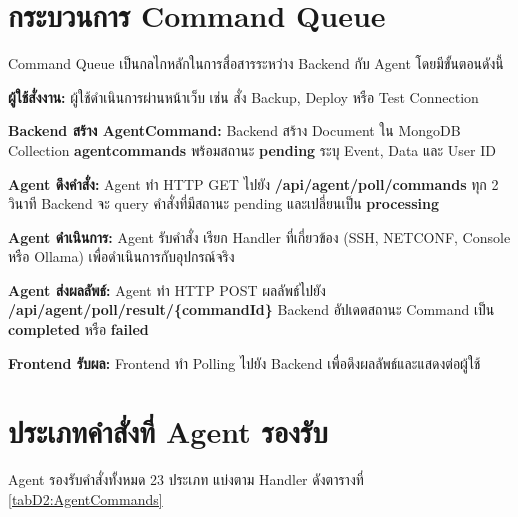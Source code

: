 \section{กระบวนการ Command Queue}
\hspace*{1.3em}
Command Queue เป็นกลไกหลักในการสื่อสารระหว่าง Backend กับ Agent โดยมีขั้นตอนดังนี้

\begin{mycustomenum2}
    \item \textbf{ผู้ใช้สั่งงาน:} ผู้ใช้ดำเนินการผ่านหน้าเว็บ เช่น สั่ง Backup, Deploy หรือ Test Connection
    \item \textbf{Backend สร้าง AgentCommand:} Backend สร้าง Document ใน MongoDB Collection \textbf{agentcommands} พร้อมสถานะ \textbf{pending} ระบุ Event, Data และ User ID
    \item \textbf{Agent ดึงคำสั่ง:} Agent ทำ HTTP GET ไปยัง \textbf{/api/agent/poll/commands} ทุก 2 วินาที Backend จะ query คำสั่งที่มีสถานะ pending และเปลี่ยนเป็น \textbf{processing}
    \item \textbf{Agent ดำเนินการ:} Agent รับคำสั่ง เรียก Handler ที่เกี่ยวข้อง (SSH, NETCONF, Console หรือ Ollama) เพื่อดำเนินการกับอุปกรณ์จริง
    \item \textbf{Agent ส่งผลลัพธ์:} Agent ทำ HTTP POST ผลลัพธ์ไปยัง \textbf{/api/agent/poll/result/\{commandId\}} Backend อัปเดตสถานะ Command เป็น \textbf{completed} หรือ \textbf{failed}
    \item \textbf{Frontend รับผล:} Frontend ทำ Polling ไปยัง Backend เพื่อดึงผลลัพธ์และแสดงต่อผู้ใช้
\end{mycustomenum2}

\section{ประเภทคำสั่งที่ Agent รองรับ}
\hspace*{1.3em}
Agent รองรับคำสั่งทั้งหมด 23 ประเภท แบ่งตาม Handler ดังตารางที่ \ref{tabD2:AgentCommands}

